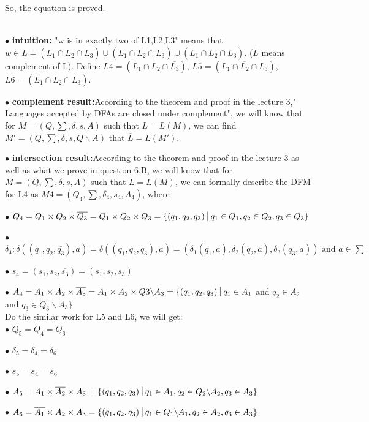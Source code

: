 \documentclass[12pt,a4paper]{article}
\newcommand{\question}[1]{\bigskip\noindent{\textbf{Q{#1} solution}}}
\begin{document}
So, the equation is proved.


\question{6.C}\\

	$\bullet$ \textbf{intuition:} "w is in exactly two of {L1,L2,L3}" means that $w \in L = (L_1 \cap L_2 \cap \overline{L_3}) \cup ( L_1 \cap \overline{L_2} \cap L_3) \cup (\overline{L_1} \cap L_2 \cap L_3)$. ($\overline{L}$ means complement of L). Define $L4=(L_1 \cap L_2 \cap \overline{L_3})$, $L5=( L_1 \cap \overline{L_2} \cap L_3)$, $L6 = (\overline{L_1} \cap L_2 \cap L_3)$.


	$\bullet$ \textbf{complement result:}According to the theorem and proof in the lecture 3," Languages accepted by DFAs are closed under complement", we will know that for $M = (Q,\sum,\delta,s,A)$ such that $L=L(M)$, we can find $M' = (Q,\sum,\delta,s,Q \backslash A)$ that $\overline{L}=L(M')$. 


	$\bullet$ \textbf{intersection result:}According to the theorem and proof in the lecture 3 as well as what we prove in question 6.B, we will know that for $M = (Q,\sum,\delta,s,A)$ such that $L=L(M)$, we can formally describe the DFM for L4 as  $M4 = (Q_{4},\sum,\delta_{4},s_{4},A_{4})$, where

	$\bullet$ $Q_4 = Q_1 \times Q_2 \times \overline{Q_3} =  Q_1 \times Q_2 \times Q_3 =\{(q_1,q_2,q_3)\ \vline\ q_1 \in Q_1, q_2 \in Q_2, q_3 \in Q_3\}$

	$\bullet$ $\delta_4: \delta((q_1,q_2,\overline{q_3}),a) = \delta((q_1,q_2,q_3),a) = (\delta_1(q_1,a),\delta_2(q_2,a),\delta_3(q_3,a)) \mbox{ and } a \in \sum$

	$\bullet$ $s_4 = (s_1,s_2,\overline{s_3}) = (s_1,s_2,s_3)$

	$\bullet$ $A_4 = A_1 \times A_2 \times \overline{A_3} = A_1 \times A_2 \times Q3 \backslash A_3 = \{(q_1,q_2,q_3)\ \vline\ q_1 \in A_1$ and $q_2 \in A_2$ and $q_3 \in Q_3 \backslash A_3\}$\\
	{Do the similar work for L5 and L6, we will get:}\\


	$\bullet$ $Q_5 = Q_4 = Q_6 $

	$\bullet$ $\delta_5 = \delta_4 = \delta_6$

	$\bullet$ $s_5 = s_4 = s_6$

	$\bullet$ $A_5 = A_1 \times \overline{A_2} \times A_3 = \{(q_1,q_2,q_3)\ \vline\ q_1 \in A_1, q_2 \in Q_2 \backslash A_2, q_3 \in A_3\}$

	$\bullet$ $A_6 = \overline{A_1} \times A_2 \times A_3 = \{(q_1,q_2,q_3)\ \vline\ q_1 \in Q_1 \backslash A_1, q_2 \in A_2, q_3 \in A_3\}$
\end{document}
